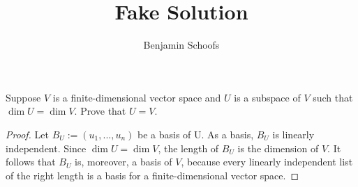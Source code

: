 \documentclass{math}
\title{Fake Solution}
\author{Benjamin Schoofs}
\begin{document}
	\maketitle
	
	\begin{exercise}[12345]
		Suppose \(V\) is a finite-dimensional vector space and \(U\) is a subspace of \(V\) such that \(\dim U = \dim V\). Prove that \(U = V\).
	\end{exercise}
	
	\begin{proof}
		Let \(B_U := (u_1, ..., u_n)\) be a basis of U. As a basis, \(B_U\) is linearly independent. Since \(\dim U = \dim V\), the length of \(B_U\) is the dimension of \(V\). It follows that \(B_U\) is, moreover, a basis of \(V\), because every linearly independent list of the right length is a basis for a finite-dimensional vector space.  
	\end{proof}

	
		
\end{document}
